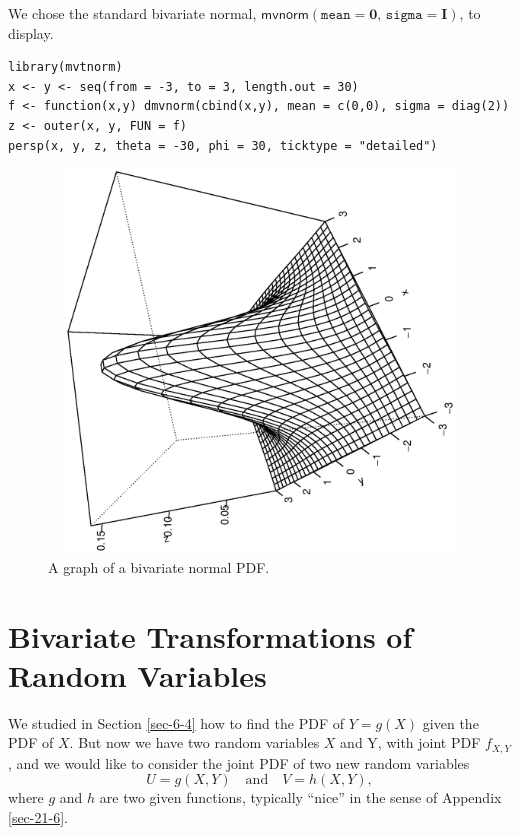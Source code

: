 \documentclass[captions=tableheading]{scrbook}
\begin{document}
We chose the standard bivariate normal, \(\mathsf{mvnorm}(\mathtt{mean}=\mathbf{0},\,\mathtt{sigma}=\mathbf{I})\), to display.


\begin{verbatim}
library(mvtnorm)
x <- y <- seq(from = -3, to = 3, length.out = 30)
f <- function(x,y) dmvnorm(cbind(x,y), mean = c(0,0), sigma = diag(2))
z <- outer(x, y, FUN = f)
persp(x, y, z, theta = -30, phi = 30, ticktype = "detailed")
\end{verbatim}





\begin{figure}[th]
  \includegraphics[width=5in, height=4in]{ps/multdist/mvnorm-pdf.ps}
  \caption[Graph of a bivariate normal PDF]{\small A graph of a bivariate normal PDF.}
  \label{fig-mvnorm-pdf}
\end{figure}
\section{Bivariate Transformations of Random Variables}
\label{sec-7-7}
\label{sec-Transformations-Multivariate}


We studied in Section \ref{sec-6-4} how to find the PDF of \(Y=g(X)\) given the PDF of \(X\). But now we have two random variables \(X\) and Y, with joint PDF \(f_{X,Y}\), and we would like to consider the joint PDF of two new random variables
\begin{equation}
U=g(X,Y)\quad\mbox{and}\quad V=h(X,Y),
\end{equation}
where \(g\) and \(h\) are two given functions, typically ``nice'' in the sense of Appendix \ref{sec-21-6}. 
\end{document}
